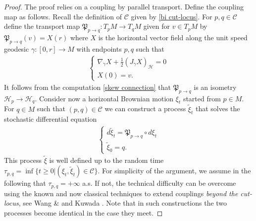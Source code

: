 \documentclass[11pt]{article}
\numberwithin{equation}{section}
\begin{document}
\begin{proof}
The proof relies on a coupling by parallel transport. Define the coupling map as follows. Recall the definition of $\mathcal C$ given by \eqref{bi cut-locus}. For $p,q \in \mathcal{C}$ define the transport map $\mathfrak{P}_{p \to q}:T_pM \to T_qM$ given for $v \in T_pM$ by $\mathfrak{P}_{p \to q}(v)=X(r)$ where $X$ is the horizontal vector field along the unit speed geodesic $\gamma:[0,r] \to M$ with endpoints $p,q$ such that
\begin{align*}
\begin{cases}
\nabla_{\dot \gamma}X+\frac{1}{2} (J_{\dot \gamma} X)_\mathcal{H}=0 \\
X(0)=v.
\end{cases}
\end{align*}
It follows from the computation \eqref{skew connection} that $\mathfrak{P}_{p \to q}$ is an isometry $\mathcal{H}_p \to \mathcal{H}_q$. 
Consider now a horizontal Brownian motion $\xi_t$ started from $p \in M$. For $q \in M$ such that $(p,q) \in \mathcal{C}$ we can construct a process $\tilde{\xi}_t$ that solves the stochastic differential equation
\begin{align*}
\begin{cases}
d\tilde{\xi}_t=\mathfrak{P}_{p \to q} \circ d\xi_t \\
\tilde{\xi}_0=q.
\end{cases}
\end{align*}
This process $\tilde{\xi}$ is well defined up to the random time $\tau_{p,q} =\inf \{ t \ge 0 | (\xi_t,\tilde{\xi}_t) \in \mathcal{C} \}$. For simplicity of the argument, we assume in the following that $\tau_{p,q}=+\infty$ a.s. If not, the technical difficulty can be overcome using the known and now classical techniques to extend  couplings \textit{beyond the cut-locus}, see Wang  \cite{wang-coupling} \& \cite[Theorem 2.3.2]{MR3154951} and Kuwada \cite{Kuwada-coupling}. Note that in such constructions the two processes become identical in the case they meet.



\end{proof}
\end{document}
